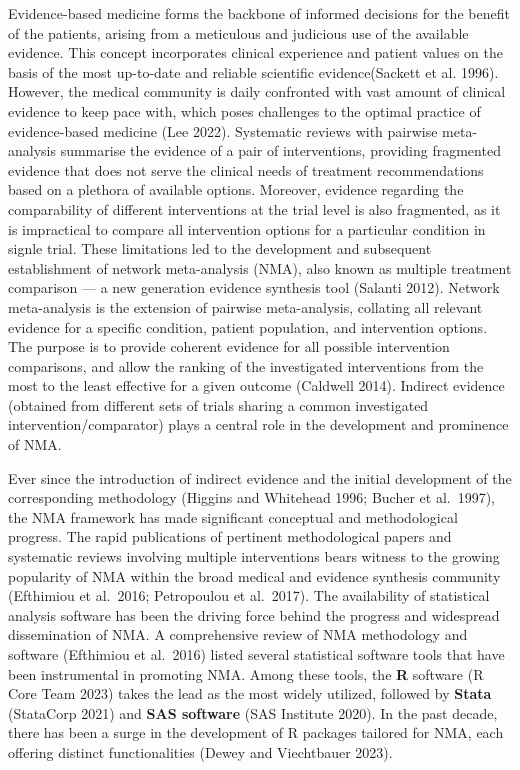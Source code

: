 Evidence-based medicine forms the backbone of informed decisions for the benefit of
the patients, arising from a meticulous and judicious use of the available evidence. This concept
incorporates clinical experience and patient values on the basis of the most up-to-date and reliable scientific evidence(Sackett et al. 1996).
However, the medical community is daily confronted with vast amount of clinical evidence to keep pace with, which poses challenges to the optimal practice of evidence-based medicine (Lee 2022).
Systematic reviews with pairwise meta-analysis summarise the evidence of a pair of
interventions, providing fragmented evidence that does not serve the clinical needs of treatment recommendations based on a plethora of available options.
Moreover, evidence regarding the comparability of different interventions at the trial
level is also fragmented, as it is impractical to compare all intervention options
for a particular condition in signle trial. These limitations led to the development and subsequent
establishment of network meta-analysis (NMA), also known as multiple treatment
comparison --- a new generation evidence synthesis tool (Salanti 2012). Network
meta-analysis is the extension of pairwise meta-analysis, collating all relevant
evidence for a specific condition, patient population, and intervention
options. The purpose is to provide coherent evidence for all possible intervention comparisons,
and allow the ranking of the investigated interventions from the most to the least effective
for a given outcome (Caldwell 2014). Indirect evidence (obtained from different
sets of trials sharing a common investigated intervention/comparator) plays a central role in the development
and prominence of NMA.

Ever since the introduction of indirect evidence and the initial development of the
corresponding methodology (Higgins and Whitehead 1996; Bucher et al.~1997), the NMA framework has made
significant conceptual and methodological progress. The rapid publications of pertinent methodological papers and systematic reviews involving multiple interventions bears witness to the growing popularity of NMA
within the broad medical and evidence synthesis community (Efthimiou et al.~2016; Petropoulou et al.~2017). The availability of statistical analysis software has been the driving force behind the progress and widespread dissemination of NMA. A comprehensive review of NMA methodology and software (Efthimiou et al.~2016) listed several
statistical software tools that have been instrumental in promoting NMA. Among these tools, the \textbf{R} software (R Core Team 2023) takes the lead as the most widely utilized, followed by \textbf{Stata} (StataCorp 2021) and \textbf{SAS software} (SAS Institute 2020). In the past decade, there has been a surge in the development of R packages tailored for NMA, each offering distinct functionalities (Dewey and Viechtbauer 2023).

